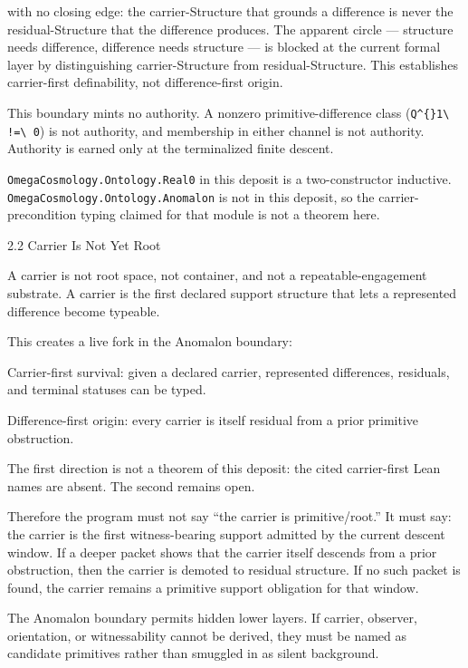 \documentclass[
  10pt,
]{article}
\newenvironment{Shaded}{}{}
\newcommand{\NormalTok}[1]{#1}
\DeclareRobustCommand{\texttt}[1]{{\paperSymbolFont\nolinkurl{#1}}}
\begin{document}
with no closing edge: the carrier-Structure that grounds a difference is never the residual-Structure that the difference produces. The apparent circle --- structure needs difference, difference needs structure --- is blocked at the current formal layer by distinguishing carrier-Structure from residual-Structure. This establishes carrier-first definability, not difference-first origin.

This boundary mints no authority. A nonzero primitive-difference class (\texttt{Q\^{}1\ !=\ 0}) is not authority, and membership in either channel is not authority. Authority is earned only at the terminalized finite descent.

\texttt{OmegaCosmology.Ontology.Real0} in this deposit is a two-constructor inductive. \texttt{OmegaCosmology.Ontology.Anomalon} is not in this deposit, so the carrier-precondition typing claimed for that module is not a theorem here.

2.2 Carrier Is Not Yet Root

A carrier is not root space, not container, and not a repeatable-engagement substrate. A carrier is the first declared support structure that lets a represented difference become typeable.

This creates a live fork in the Anomalon boundary:

\begin{Shaded}
\begin{Highlighting}[]
\NormalTok{Carrier{-}first survival:}
\NormalTok{  given a declared carrier, represented differences, residuals, and terminal statuses can be typed.}

\NormalTok{Difference{-}first origin:}
\NormalTok{  every carrier is itself residual from a prior primitive obstruction.}
\end{Highlighting}
\end{Shaded}

The first direction is not a theorem of this deposit: the cited carrier-first Lean names are absent. The second remains open.

Therefore the program must not say ``the carrier is primitive/root.'' It must say: the carrier is the first witness-bearing support admitted by the current descent window. If a deeper packet shows that the carrier itself descends from a prior obstruction, then the carrier is demoted to residual structure. If no such packet is found, the carrier remains a primitive support obligation for that window.

The Anomalon boundary permits hidden lower layers. If carrier, observer, orientation, or witnessability cannot be derived, they must be named as candidate primitives rather than smuggled in as silent background.
\end{document}
